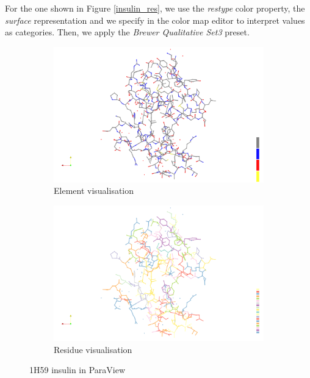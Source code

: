 \documentclass[openany]{article}
\begin{document}
For the one shown in Figure \ref{insulin_res}, we use the \textit{restype} color property, the \textit{surface} representation and we specify in the color map editor to interpret values as categories. Then, we apply the \textit{Brewer Qualitative Set3} preset.

\begin{figure}[h]
\centering
\begin{subfigure}{.5\textwidth}
  \centering
  \includegraphics[width=\linewidth]{Proteins/1h59_insulin_el_pv}
  \caption{Element visualisation}
\end{subfigure}%
\begin{subfigure}{.5\textwidth}
\centering
  \includegraphics[width=\linewidth]{Proteins/1h59_insulin_res_pv}
  \caption{Residue visualisation}
\end{subfigure}
\caption{1H59 insulin in ParaView}
\end{figure}
\end{document}
